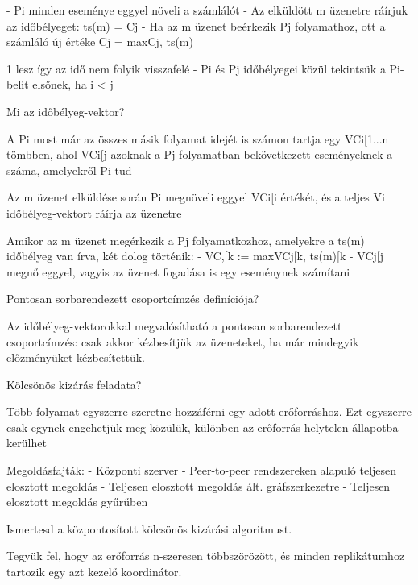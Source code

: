 \documentclass[twoside, a4paper, 12pt]{article}
\begin{document}
\begin{description}
            - Pi minden eseménye eggyel növeli a számlálót
            - Az elküldött m üzenetre ráírjuk az időbélyeget: ts(m) = Cj
            - Ha az m üzenet beérkezik Pj folyamathoz, ott a számláló új értéke Cj = max{Cj, ts(m)}\item1 lesz így az idő nem folyik visszafelé
            - Pi és Pj időbélyegei közül tekintsük a Pi-belit elsőnek, ha i < j
        \item  Mi az időbélyeg-vektor?
        \item A Pi most már az összes másik folyamat idejét is számon tartja egy VCi[1...n tömbben,
                ahol VCi[j azoknak a Pj folyamatban bekövetkezett eseményeknek a száma, amelyekről Pi tud
                \item Az m üzenet elküldése során Pi megnöveli eggyel  VCi[i értékét, és a teljes Vi időbélyeg-vektort ráírja az üzenetre
                    \item Amikor az m üzenet megérkezik a Pj folyamatkozhoz, amelyekre a ts(m) időbélyeg van írva, két dolog történik:
                        - VC,[k := max{VCj[k, ts(m)[k}
                                    - VCj[j megnő eggyel, vagyis az üzenet fogadása is egy eseménynek számítani
                                    \item  Pontosan sorbarendezett csoportcímzés definíciója?
                                    \item Az időbélyeg-vektorokkal megvalósítható a pontosan sorbarendezett csoportcímzés: csak akkor kézbesítjük az üzeneteket,
                                        ha már mindegyik előzményüket kézbesítettük.
                                    \item  Kölcsönös kizárás feladata?
                                    \item Több folyamat egyszerre szeretne hozzáférni egy adott erőforráshoz. Ezt egyszerre csak egynek engehetjük meg közülük,
                                        különben az erőforrás helytelen állapotba kerülhet
                                    \item Megoldásfajták: 
                                        - Központi szerver
                                        - Peer-to-peer rendszereken alapuló teljesen elosztott megoldás
                                        - Teljesen elosztott megoldás ált. gráfszerkezetre
                                        - Teljesen elosztott megoldás gyűrűben
                                    \item  Ismertesd a központosított kölcsönös kizárási algoritmust.
                                    \item Tegyük fel, hogy az erőforrás n-szeresen többszörözött, és minden replikátumhoz tartozik egy azt kezelő koordinátor.

\end{description}
\end{document}
